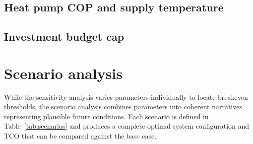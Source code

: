 \documentclass[11pt,a4paper]{report}
\begin{document}
\subsection{Heat pump COP and supply temperature}
\label{sub:sens_hp}


\subsection{Investment budget cap}
\label{sub:sens_budget}


\section{Scenario analysis}
\label{sec:results_scenarios}

While the sensitivity analysis varies parameters individually to locate breakeven
thresholds, the scenario analysis combines parameters into coherent narratives
representing plausible future conditions.
Each scenario is defined in Table~\ref{tab:scenarios} and produces a complete
optimal system configuration and TCO that can be compared against the base case.
\end{document}
